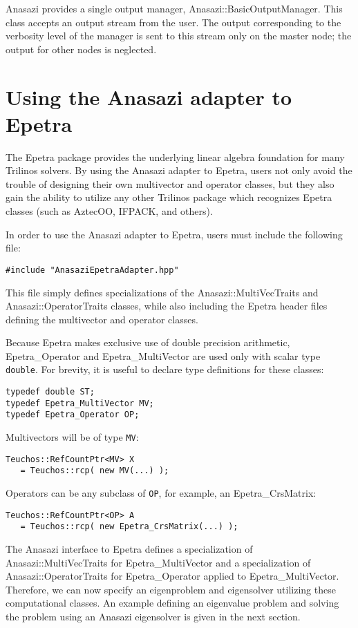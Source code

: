Anasazi provides a single output manager, Anasazi::BasicOutputManager. This class accepts
an output stream from the user. The output corresponding to the verbosity level of the
manager is sent to this stream only on the master node; the output for other nodes is
neglected.

\section{Using the Anasazi adapter to Epetra}
\label{sec:anasazi:epetra}

The Epetra package provides the underlying linear algebra foundation for many
Trilinos solvers.  By using the Anasazi adapter to Epetra, users not only
avoid the trouble of designing their own multivector and operator classes, but
they also gain the ability to utilize any other Trilinos package which
recognizes Epetra classes (such as AztecOO, IFPACK, and others).

In order to use the Anasazi adapter to Epetra, users must include the following
file:
\begin{verbatim}
#include "AnasaziEpetraAdapter.hpp"
\end{verbatim}
This file simply defines specializations of the Anasazi::MultiVecTraits
and Anasazi::OperatorTraits classes, while also including the Epetra
header files defining the multivector and operator classes.

Because Epetra makes exclusive use of double precision arithmetic, 
Epetra\_Operator and Epetra\_MultiVector are used only with 
scalar type \verb!double!. For brevity, it is useful to declare type definitions
for these classes:
\begin{verbatim}
typedef double ST;
typedef Epetra_MultiVector MV;
typedef Epetra_Operator OP;
\end{verbatim}

\noindent Multivectors will be of type \verb!MV!:
\begin{verbatim}
Teuchos::RefCountPtr<MV> X 
   = Teuchos::rcp( new MV(...) );
\end{verbatim}

\noindent Operators can be any subclass of \verb!OP!, for example, an Epetra\_CrsMatrix:
\begin{verbatim}
Teuchos::RefCountPtr<OP> A 
   = Teuchos::rcp( new Epetra_CrsMatrix(...) );
\end{verbatim}

The Anasazi interface to Epetra defines a specialization of
Anasazi::MultiVecTraits for Epetra\_MultiVector and a
specialization of Anasazi::OperatorTraits for Epetra\_Operator
applied to Epetra\_MultiVector. Therefore, we can now specify an
eigenproblem and eigensolver utilizing these computational classes. An example
defining an eigenvalue problem and solving the problem using an Anasazi
eigensolver is given in the next section.



